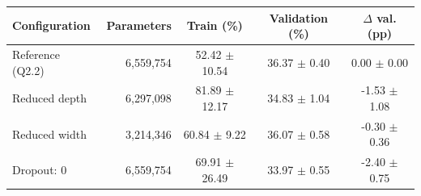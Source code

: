\begin{tabular}{l r c c c}
\hline
Configuration & Parameters & Train (\%) & Validation (\%) & $\Delta$ val. (pp) \\
\hline
Reference (Q2.2) & 6,559,754 & 52.42 $\pm$ 10.54 & 36.37 $\pm$ 0.40 & 0.00 $\pm$ 0.00 \\
Reduced depth & 6,297,098 & 81.89 $\pm$ 12.17 & 34.83 $\pm$ 1.04 & -1.53 $\pm$ 1.08 \\
Reduced width & 3,214,346 & 60.84 $\pm$ 9.22 & 36.07 $\pm$ 0.58 & -0.30 $\pm$ 0.36 \\
Dropout: 0 & 6,559,754 & 69.91 $\pm$ 26.49 & 33.97 $\pm$ 0.55 & -2.40 $\pm$ 0.75 \\
\hline
\end{tabular}
